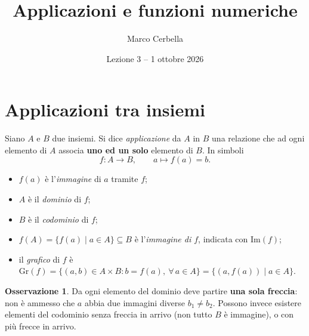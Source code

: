 \documentclass[11pt,a4paper]{article}
\title{Applicazioni e funzioni numeriche}
\author{Marco Cerbella}
\date{Lezione 3 -- 1 ottobre 2026}
\theoremstyle{definition}
\newtheorem*{osservazione}{Osservazione}
\begin{document}
\maketitle

\section{Applicazioni tra insiemi}

\begin{definizione}
Siano $A$ e $B$ due insiemi. Si dice \emph{applicazione} da $A$ in $B$ una relazione che ad ogni elemento di $A$ associa \textbf{uno ed un solo} elemento di $B$. In simboli
\[
f : A \to B, \qquad a \mapsto f(a) = b.
\]
\end{definizione}

\begin{itemize}
    \item $f(a)$ è l'\emph{immagine} di $a$ tramite $f$;
    \item $A$ è il \emph{dominio} di $f$;
    \item $B$ è il \emph{codominio} di $f$;
    \item $f(A) = \{f(a) \mid a \in A\} \subseteq B$ è l'\emph{immagine di $f$}, indicata con $\mathrm{Im}(f)$;
    \item il \emph{grafico} di $f$ è
    $\mathrm{Gr}(f) = \{(a, b) \in A \times B : b = f(a),\ \forall\, a \in A\} = \{(a, f(a)) \mid a \in A\}$.
\end{itemize}

\begin{osservazione}
Da ogni elemento del dominio deve partire \textbf{una sola freccia}: non è ammesso che $a$ abbia due immagini diverse $b_1 \neq b_2$. Possono invece esistere elementi del codominio senza freccia in arrivo (non tutto $B$ è immagine), o con più frecce in arrivo.
\end{osservazione}

\begin{center}
\end{center}
\end{document}
